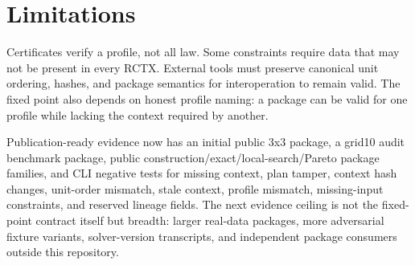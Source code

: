 \section{Limitations}

Certificates verify a profile, not all law. Some constraints require data that
may not be present in every RCTX. External tools must preserve canonical unit
ordering, hashes, and package semantics for interoperation to remain valid.
The fixed point also depends on honest profile naming: a package can be valid
for one profile while lacking the context required by another.

Publication-ready evidence now has an initial public 3x3 package, a grid10
audit benchmark package, public construction/exact/local-search/Pareto package
families, and CLI negative tests for missing context, plan tamper, context hash
changes, unit-order mismatch, stale context, profile mismatch, missing-input
constraints, and reserved lineage fields. The next evidence ceiling is not the
fixed-point contract itself but breadth: larger real-data packages, more
adversarial fixture variants, solver-version transcripts, and independent
package consumers outside this repository.
